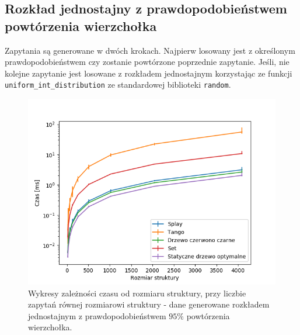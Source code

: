 \documentclass[declaration,shortabstract]{iithesis}
\theoremstyle{thm}
\theoremstyle{remark}
\theoremstyle{plain}
\theoremstyle{plain}
\theoremstyle{plain}
\begin{document}
\subsection{Rozkład jednostajny z prawdopodobieństwem powtórzenia wierzchołka}
Zapytania są generowane w dwóch krokach. Najpierw losowany jest z określonym prawdopodobieństwem czy zostanie powtórzone poprzednie zapytanie. Jeśli, nie kolejne zapytanie jest losowane z rozkładem jednostajnym korzystając ze funkcji \texttt{uniform\_int\_distribution} ze standardowej biblioteki \texttt{random}. 

\begin{figure}[H]  
\centering
    \includegraphics[scale=0.5]{wykresy/uniform5_main.png}
      \caption{Wykresy zależności czasu od rozmiaru struktury, przy liczbie zapytań równej rozmiarowi struktury - dane generowane rozkładem jednostajnym z prawdopodobieństwem  \(95\%\) powtórzenia wierzchołka.}  
\end{figure}
\end{document}
